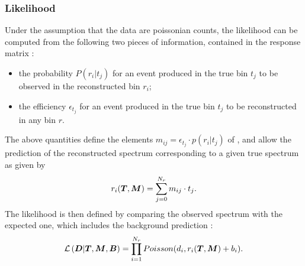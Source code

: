 \subsubsection{Likelihood}
\label{sec:fbullhood}
Under the assumption that the data are poissonian counts, the
likelihood \conditionalLhood{\Data{}}{\Truth{},\TrasfMatrix{}} can be
computed from the following two pieces of information, contained in
the response matrix \TrasfMatrix{}:
\begin{itemize}
\item the probability $P(r_i|t_j)$ for an event produced in the true bin
  $t_j$ to be observed in the reconstructed bin $r_i$;
\item the efficiency $\epsilon{}_{t_j}$ for an event produced in the
  true bin $t_j$ to be reconstructed in any bin $r$.
\end{itemize}
The above quantities define the elements
$m_{ij}=\epsilon_{t_j}\cdot{}p(r_i|t_j)$ of \TrasfMatrix{}, and allow
the prediction of the reconstructed spectrum \Reco{} corresponding to
a given true spectrum \Truth{} as given by
\begin{equation}
r_i(\boldsymbol{T}{},\boldsymbol{M}{}) = \sum_{j=0}^{N_r}m_{ij}\cdot{}t_j.
\end{equation}
The likelihood is then defined by comparing the observed spectrum
\Data{} with the expected one, which includes the background
prediction \Bckg{}:
\begin{equation}
\label{eq:lhood}
\mathcal{L}\left(\boldsymbol{D}{}|\boldsymbol{T}{},\boldsymbol{M}{},\boldsymbol{B}{}\right) =
\prod_{i=1}^{N_r}Poisson(d_i,r_i(\boldsymbol{T}{},\boldsymbol{M}{})+b_i).
\end{equation}

